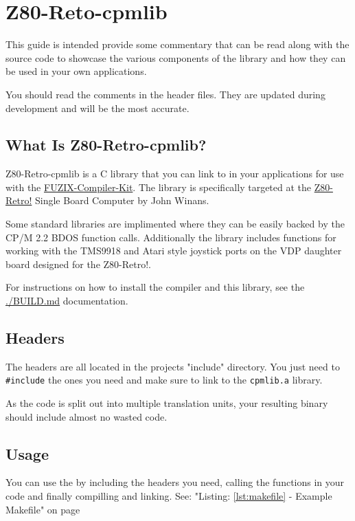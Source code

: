 \documentclass[10pt,a4paper]{article}
\begin{document}
\section{Z80-Reto-cpmlib}

This guide is intended provide some commentary that can be read along with the
source code to showcase the various components of the library and how they can
be used in your own applications.

You should read the comments in the header files.  They are updated during
development and will be the most accurate.

\subsection{What Is Z80-Retro-cpmlib?}

Z80-Retro-cpmlib is a C library that you can link to in your applications for
use with the
\href{https://github.com/etchedpixels/fuzix-compiler-kit.git}{FUZIX-Compiler-Kit}.
The library is specifically targeted at the
\href{https://github.com/z80-retro}{Z80-Retro!} Single Board Computer by John
Winans.

Some standard libraries are implimented where they can be easily backed by the
CP/M 2.2 BDOS function calls.  Additionally the library includes functions for
working with the TMS9918 and Atari style joystick ports on the VDP daughter
board designed for the Z80-Retro!.

For instructions on how to install the compiler and this library, see the
\url{./BUILD.md} documentation.

\subsection{Headers}

The headers are all located in the projects "include" directory.  You just need
to \texttt{\#include} the ones you need and make sure to link to the
\texttt{cpmlib.a} library.

As the code is split out into multiple translation units, your resulting binary
should include almost no wasted code.

\subsection{Usage}

You can use the by including the headers you need, calling the functions in
your code and finally compilling and linking. See: "Listing: \ref{lst:makefile}
- Example Makefile" on page \pageref{lst:makefile}
\end{document}

